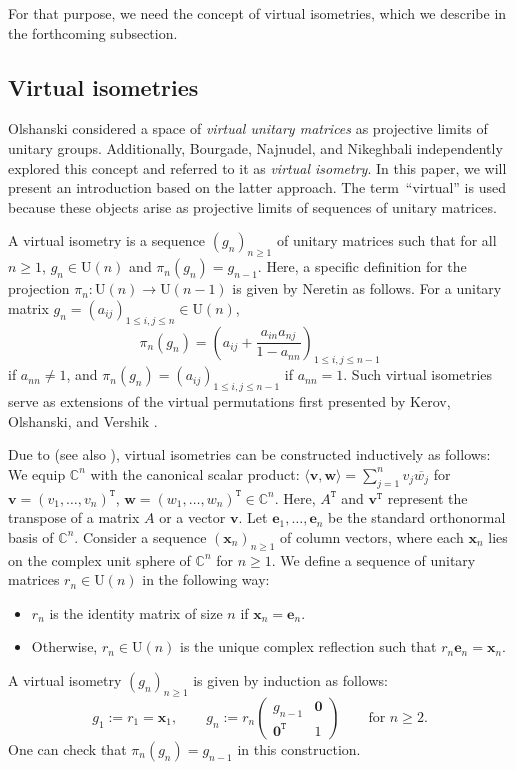 \documentclass[pdftex]{sigma}
\numberwithin{equation}{section}
\theoremstyle{definition}
\newcommand{\UU}{\mathrm{U}}
\newcommand{\trans}[1]{#1^{\mathtt{T}}}
\begin{document}
For that purpose, we need the concept of virtual isometries, which we describe in the forthcoming subsection.


\subsection{Virtual isometries}


Olshanski \cite{Olshanski_unitary} considered a space of \emph{virtual unitary matrices} as projective limits of unitary groups.
Additionally, Bourgade, Najnudel, and Nikeghbali \cite{BNN} independently explored this concept and referred to it as \emph{virtual isometry}.
In this paper, we will present an introduction based on the latter approach.
 The term\ ``virtual'' is used because these objects arise as projective limits of sequences of unitary matrices.

A virtual isometry is a sequence $(g_n)_{n \ge 1}$ of unitary matrices
such that for all $n \ge 1$, $g_n \in \UU(n)$ and $\pi_{n}(g_{n})=g_{n-1}$.
Here, a specific definition for the projection $\pi_{n}\colon \UU(n) \to \UU(n-1)$ is given by Neretin \cite{Neretin} as follows.
For a unitary matrix $g_{n}= (a_{ij})_{1 \le i,j \le n} \in \UU(n)$,
\[
\pi_{n} (g_{n})= \left(a_{ij} + \frac{a_{in} a_{nj}}{1-a_{nn}} \right)_{1 \le i,j \le n-1}
\]
if $a_{nn} \not=1$,
and $\pi_{n} (g_{n})=(a_{ij})_{1 \le i,j \le n-1}$ if $a_{nn}=1$.
Such virtual isometries serve as extensions of the virtual permutations first presented by Kerov, Olshanski, and Vershik \cite{KOV1993, KOV2004}.

Due to \cite{BNN} (see also \cite{MNN}),
virtual isometries can be constructed inductively as follows:
We equip $\mathbb{C}^n$ with the canonical scalar product: $\langle \bm{v},\bm{w} \rangle
=\sum_{j=1}^n v_j \overline{w_j}$ for $\bm{v}= \trans{(v_1,\dots,v_n)}$,
$\bm{w}=\trans{(w_1,\dots,w_n)} \in \mathbb{C}^n$.
Here, $\trans{A}$ and $\trans{\bm{v}}$ represent the transpose of a matrix $A$ or a vector $\bm{v}$.
Let $\bm{e}_1,\dots, \bm{e}_n$ be the standard orthonormal basis of $\mathbb{C}^n$.
Consider a sequence $(\bm{x}_n)_{n \ge 1}$ of column vectors, where each $\bm{x}_n$ lies on
the complex unit sphere of $\mathbb{C}^n$ for $n \ge 1$.
We define a sequence of unitary matrices $r_n \in \UU(n)$ in the following way:
\begin{itemize}\itemsep=0pt
\item $r_n$ is the identity matrix of size $n$ if $\bm{x}_n=\bm{e}_n$.
\item Otherwise, $r_n \in \UU(n)$ is the unique complex reflection such that $r_n \bm{e}_n=\bm{x}_n$.
\end{itemize}
A virtual isometry $(g_n)_{n \ge 1}$ is given by induction as follows:{\samepage
\[
g_1:=r_1=\bm{x}_1, \qquad g_n:= r_n \begin{pmatrix} g_{n-1} & \bm{0} \\ \trans{\bm{0}} & 1 \end{pmatrix}
\qquad \text{for $n \ge 2$}.
\]
One can check that $\pi_{n}(g_n)=g_{n-1}$ in this construction.}
\end{document}
